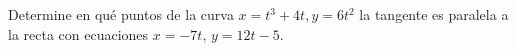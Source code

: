 \item Determine en qué puntos de la curva $x = t^3 + 4t, y = 6t^2$ la tangente es paralela a la recta con ecuaciones $x = -7t$, $y = 12t - 5$.
